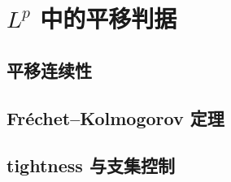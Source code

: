 \section{\texorpdfstring{\(L^p\)}{Lᵖ} 中的平移判据}
\label{b1:sec:2501}


\subsection{平移连续性}
\label{b1:subsec:250101}

\subsection{Fréchet–Kolmogorov 定理}
\label{b1:subsec:250102}

\subsection{tightness 与支集控制}
\label{b1:subsec:250103}


